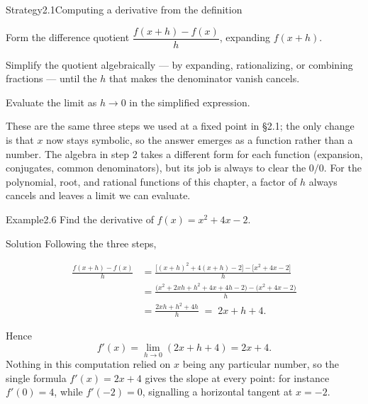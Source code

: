 \documentclass[a4paper,12pt,oneside]{memoir}
\begin{document}
\begin{envstrategy}{Strategy}{2.1}{Computing a derivative from the definition}
\begin{steps}
  \item Form the difference quotient \(\dfrac{f(x + h) - f(x)}{h}\), expanding \(f(x + h)\).
  \item Simplify the quotient algebraically — by expanding, rationalizing, or combining fractions — until the \(h\) that makes the denominator vanish cancels.
  \item Evaluate the limit as \(h \to 0\) in the simplified expression.
\end{steps}
These are the same three steps we used at a fixed point in §2.1; the only change is that \(x\) now stays symbolic, so the answer emerges as a function rather than a number. The algebra in step 2 takes a different form for each function (expansion, conjugates, common denominators), but its job is always to clear the \(0/0\). For the polynomial, root, and rational functions of this chapter, a factor of \(h\) always cancels and leaves a limit we can evaluate.
\end{envstrategy}
\begin{workedexample}
\begin{envexample}{Example}{2.6}{}
Find the derivative of \(f(x) = x^{2} + 4x - 2\).
\end{envexample}
\begin{envsolution}{Solution}{}{}
Following the three steps,

\[ \begin{aligned}
          \frac{f(x + h) - f(x)}{h}
            &= \frac{\bigl[(x + h)^{2} + 4(x + h) - 2\bigr] - \bigl[x^{2} + 4x - 2\bigr]}{h} \\[2pt]
            &= \frac{\bigl(x^{2} + 2xh + h^{2} + 4x + 4h - 2\bigr) - \bigl(x^{2} + 4x - 2\bigr)}{h} \\[2pt]
            &= \frac{2xh + h^{2} + 4h}{h} \;=\; 2x + h + 4.
        \end{aligned} \]

Hence \[ f'(x) = \lim_{h \to 0} (2x + h + 4) = 2x + 4. \] Nothing in this computation relied on \(x\) being any particular number, so the single formula \(f'(x) = 2x + 4\) gives the slope at every point: for instance \(f'(0) = 4\), while \(f'(-2) = 0\), signalling a horizontal tangent at \(x = -2\).
\end{envsolution}
\end{workedexample}
\end{document}
